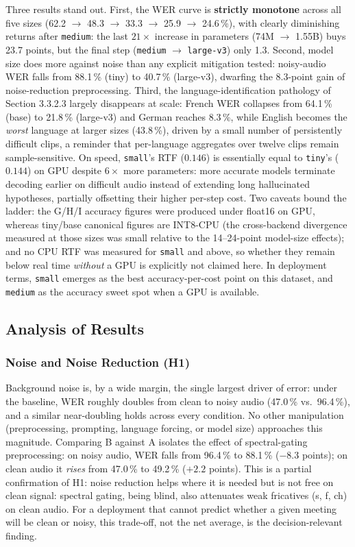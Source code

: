 \documentclass[12pt]{report}
\begin{document}
Three results stand out. First, the WER curve is \textbf{strictly monotone} across all five sizes (62.2 $\to$ 48.3 $\to$ 33.3 $\to$ 25.9 $\to$ 24.6\,\%), with clearly diminishing returns after \texttt{medium}: the last $21\times$ increase in parameters (74M $\to$ 1.55B) buys 23.7 points, but the final step (\texttt{medium} $\to$ \texttt{large-v3}) only 1.3. Second, model size does more against noise than any explicit mitigation tested: noisy-audio WER falls from 88.1\,\% (tiny) to 40.7\,\% (large-v3), dwarfing the 8.3-point gain of noise-reduction preprocessing. Third, the language-identification pathology of Section 3.3.2.3 largely disappears at scale: French WER collapses from 64.1\,\% (base) to 21.8\,\% (large-v3) and German reaches 8.3\,\%, while English becomes the \emph{worst} language at larger sizes (43.8\,\%), driven by a small number of persistently difficult clips, a reminder that per-language aggregates over twelve clips remain sample-sensitive. On speed, \texttt{small}'s RTF ($0.146$) is essentially equal to \texttt{tiny}'s ($0.144$) on GPU despite $6\times$ more parameters: more accurate models terminate decoding earlier on difficult audio instead of extending long hallucinated hypotheses, partially offsetting their higher per-step cost. Two caveats bound the ladder: the G/H/I accuracy figures were produced under float16 on GPU, whereas tiny/base canonical figures are INT8-CPU (the cross-backend divergence measured at those sizes was small relative to the 14--24-point model-size effects); and no CPU RTF was measured for \texttt{small} and above, so whether they remain below real time \emph{without} a GPU is explicitly not claimed here. In deployment terms, \texttt{small} emerges as the best accuracy-per-cost point on this dataset, and \texttt{medium} as the accuracy sweet spot when a GPU is available.
\subsection{Analysis of Results}
\subsubsection{Noise and Noise Reduction (H1)}
Background noise is, by a wide margin, the single largest driver of error: under the baseline, WER roughly doubles from clean to noisy audio (47.0\,\% vs.\ 96.4\,\%), and a similar near-doubling holds across every condition. No other manipulation (preprocessing, prompting, language forcing, or model size) approaches this magnitude. Comparing B against A isolates the effect of spectral-gating preprocessing: on noisy audio, WER falls from 96.4\,\% to 88.1\,\% ($-8.3$ points); on clean audio it \emph{rises} from 47.0\,\% to 49.2\,\% ($+2.2$ points). This is a partial confirmation of H1: noise reduction helps where it is needed but is not free on clean signal: spectral gating, being blind, also attenuates weak fricatives (s, f, ch) on clean audio. For a deployment that cannot predict whether a given meeting will be clean or noisy, this trade-off, not the net average, is the decision-relevant finding.
\end{document}

